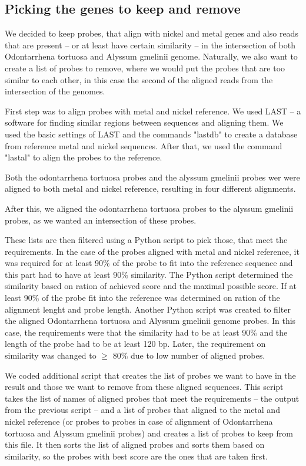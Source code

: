 \subsection{Picking the genes to keep and remove}

We decided to keep probes, that align with nickel and metal genes and also reads that are present -- or at least have certain similarity -- in the intersection of both 
Odontarrhena tortuosa and Alyssum gmelinii genome. Naturally, we also want to create a list of probes to remove, where we would put the probes that are too similar to each other, in this 
case the second of the aligned reads from the intersection of the genomes. 

First step was to align probes with metal and nickel reference. We used LAST -- a software for finding similar regions between sequences and aligning them. \cite{last} 
We used the basic settings of LAST and the commands "lastdb" to create a database from reference metal and nickel sequences. After that, we used the command "lastal" to 
align the probes to the reference. 

Both the odontarrhena tortuosa probes and the alyssum gmelinii probes wer were aligned to both metal and nickel reference, resulting in four different alignments. 

After this, we aligned the odontarrhena tortuosa probes to the alyssum gmelinii probes, as we wanted an intersection of these probes. 

These lists are then filtered using a Python script to pick those, that meet the requirements. 
In the case of the probes aligned with metal and nickel reference, it was required for at least 90\% of the probe to fit into the reference sequence and this part had to have at least 90\% similarity. 
The Python script determined the similarity based on ration of achieved score and the maximal possible score. If at least 90\% of the probe fit into the reference was determined on ration of the alignment lenght 
and probe length. 
Another Python script was created to filter the aligned Odontarrhena tortuosa and Alyssum gmelinii genome probes. In this case, the requirements were that the similarity had to be at least 90\% and the length of the probe had to be at least 120 bp. Later, the requirement on similarity was changed to $\geq$ 80\% due to low number of aligned probes. 

We coded additional script that creates the list of probes we want to have in the result and those we want to remove from these aligned sequences. 
This script takes the list of names of aligned probes that meet the requirements -- the output from the previous script -- and a list of probes that aligned to the metal and nickel reference (or probes to probes in case of alignment of Odontarrhena tortuosa and Alyssum gmelinii probes) and creates a list of probes to keep from this file. It then sorts the list of aligned probes and sorts them based on similarity, so the 
probes with best score are the ones that are taken first. 

